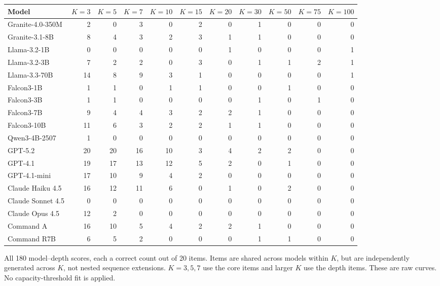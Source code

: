 \begin{minipage}[t]{\textwidth}
\centering
\footnotesize
\setlength{\tabcolsep}{3pt}
\begin{tabular}{lrrrrrrrrrr}
\toprule
Model & $K=3$ & $K=5$ & $K=7$ & $K=10$ & $K=15$ & $K=20$ & $K=30$ & $K=50$ & $K=75$ & $K=100$ \\
\midrule
Granite-4.0-350M & 2 & 0 & 3 & 0 & 2 & 0 & 1 & 0 & 0 & 0 \\
Granite-3.1-8B & 8 & 4 & 3 & 2 & 3 & 1 & 1 & 0 & 0 & 0 \\
Llama-3.2-1B & 0 & 0 & 0 & 0 & 0 & 1 & 0 & 0 & 0 & 1 \\
Llama-3.2-3B & 7 & 2 & 2 & 0 & 3 & 0 & 1 & 1 & 2 & 1 \\
Llama-3.3-70B & 14 & 8 & 9 & 3 & 1 & 0 & 0 & 0 & 0 & 1 \\
Falcon3-1B & 1 & 1 & 0 & 1 & 1 & 0 & 0 & 1 & 0 & 0 \\
Falcon3-3B & 1 & 1 & 0 & 0 & 0 & 0 & 1 & 0 & 1 & 0 \\
Falcon3-7B & 9 & 4 & 4 & 3 & 2 & 2 & 1 & 0 & 0 & 0 \\
Falcon3-10B & 11 & 6 & 3 & 2 & 2 & 1 & 1 & 0 & 0 & 0 \\
Qwen3-4B-2507 & 1 & 0 & 0 & 0 & 0 & 0 & 0 & 0 & 0 & 0 \\
GPT-5.2 & 20 & 20 & 16 & 10 & 3 & 4 & 2 & 2 & 0 & 0 \\
GPT-4.1 & 19 & 17 & 13 & 12 & 5 & 2 & 0 & 1 & 0 & 0 \\
GPT-4.1-mini & 17 & 10 & 9 & 4 & 2 & 0 & 0 & 0 & 0 & 0 \\
Claude Haiku 4.5 & 16 & 12 & 11 & 6 & 0 & 1 & 0 & 2 & 0 & 0 \\
Claude Sonnet 4.5 & 0 & 0 & 0 & 0 & 0 & 0 & 0 & 0 & 0 & 0 \\
Claude Opus 4.5 & 12 & 2 & 0 & 0 & 0 & 0 & 0 & 0 & 0 & 0 \\
Command A & 16 & 10 & 5 & 4 & 2 & 2 & 1 & 0 & 0 & 0 \\
Command R7B & 6 & 5 & 2 & 0 & 0 & 0 & 1 & 1 & 0 & 0 \\
\bottomrule
\end{tabular}
\caption{All 180 model--depth scores, each a correct count out of 20 items. Items are shared across models within $K$, but are independently generated across $K$, not nested sequence extensions. $K=3,5,7$ use the core items and larger $K$ use the depth items. These are raw curves. No capacity-threshold fit is applied.}
\label{tab:depth-by-model}
\end{minipage}

